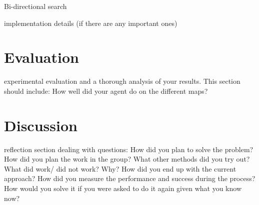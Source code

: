 \documentclass[a4paper,11pt]{article}
\begin{document}
\begin{algorithm}
  \DontPrintSemicolon

\caption{Bi-directional search}
\label{alg:bidi}
\end{algorithm}

implementation details (if there are any important ones)
\section{Evaluation}
experimental evaluation and a thorough analysis of your results. This section should include:
How well did your agent do on the different maps?
\section{Discussion}
reflection section dealing with questions: How did you plan to solve the problem? How did you plan the work in the group? What other methods did you try out? What did work/ did not work? Why? How did you end up with the current approach? How did you measure the performance and success during the process? How would you solve it if you were asked to do it again given what you know now?

\printbibliography
\end{document}
